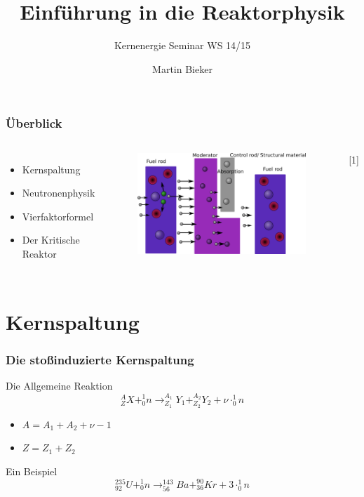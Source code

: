 \documentclass{beamer}[9pt]
\title[Reaktorphysik]{Einführung in die Reaktorphysik}
\author{Martin Bieker}
\subtitle{Kernenergie Seminar WS 14/15}
\date{}
\begin{document}
\begin{frame}
\titlepage 
\end{frame}


\begin{frame}
\frametitle{Überblick}

\begin{columns}[c] 

\begin{itemize}
\item<1-> Kernspaltung
\item<2-> Neutronenphysik
\item<3-> Vierfaktorformel
\item<4> Der Kritische Reaktor
\end{itemize}

\begin{figure}[htp]
\centering
\includegraphics[scale=0.2]{thermal_reactor_full.png}

\end{figure}
\hspace{.5\columnwidth}[1]
\end{columns}


\end{frame}

\section[]{Kernspaltung}

\begin{frame}
\frametitle{Die stoßinduzierte Kernspaltung}

\begin{block}{Die Allgemeine Reaktion}
\[
^{A}_{Z}X + ^1_0n \rightarrow ^{A_1}_{Z_1}Y_1 + ^{A_2}_{Z_2}Y_2 + \nu \cdot ^1_0n
\]
\pause
\begin{itemize}
\item$A = A_1 + A_2 + \nu -1 $
\item $Z = Z_1 + Z_2$
\end{itemize}
\end{block}
\pause
\begin{block}{Ein Beispiel}
\[
^{235}_{92}U + ^1_0n \rightarrow ^{143}_{56}Ba + ^{90}_{36}Kr + 3 \cdot ^1_0n
\]
\end{block}


\end{frame}
\end{document}
